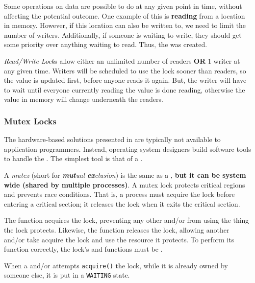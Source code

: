 Some operations on data are possible to do at any given point in time, without affecting the potential outcome.
One example of this is \textbf{reading} from a location in memory.
However, if this location can also be written to, we need to limit the number of writers.
Additionally, if someone is waiting to write, they should get some priority over anything waiting to read.
Thus, the  was created.

\begin{definition}\label{def:Read_Write_Lock}
  \emph{Read/Write Lock}s allow either an unlimited number of readers \textbf{OR} 1 writer at any given time.
  Writers will be scheduled to use the lock sooner than readers, so the value is updated first, before anyone reads it again.
  But, the writer will have to wait until everyone currently reading the value is done reading, otherwise the value in memory will change underneath the readers.
\end{definition}

\subsubsection{Mutex Locks}\label{subsubsec:Mutex_Locks}
The hardware-based solutions presented in  are typically not available to application programmers.
Instead, operating system designers build software tools to handle the .
The simplest tool is that of a .

\begin{definition}[Mutex]\label{def:Mutex}
  A \emph{mutex} (short for \emph{\textbf{mut}ual \textbf{ex}clusion}) is the same as a , \textbf{but it can be system wide (shared by multiple processes)}.
  A mutex lock protects critical regions and prevents race conditions.
  That is, a process must acquire the lock before entering a critical section; it releases the lock when it exits the critical section.

  The  function acquires the lock, preventing any other  and/or  from using the thing the lock protects.
  Likewise, the  function releases the lock, allowing another  and/or  take acquire the lock and use the resource it protects.
  To perform its function correctly, the lock's  and  functions must be .

  When a  and/or  attempts \texttt{acquire()} the lock, while it is already owned by someone else, it is put in a \texttt{WAITING} state.
\end{definition}

